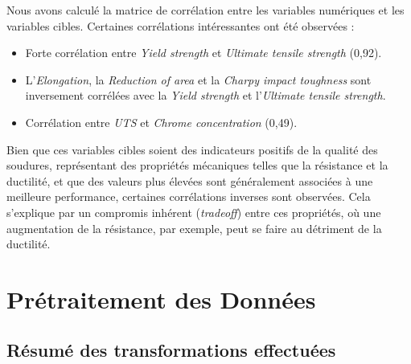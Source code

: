 \documentclass{article}
\begin{document}
Nous avons calculé la matrice de corrélation entre les variables numériques et les variables cibles. Certaines corrélations intéressantes ont été observées :

\begin{itemize}
    \item Forte corrélation entre \textit{Yield strength} et \textit{Ultimate tensile strength} (0,92).
    \item L'\textit{Elongation}, la \textit{Reduction of area} et la \textit{Charpy impact toughness} sont inversement corrélées avec la \textit{Yield strength} et l'\textit{Ultimate tensile strength}.
    \item Corrélation entre \textit{UTS} et \textit{Chrome concentration} (0,49).
\end{itemize}

\vspace{0.25cm}

Bien que ces variables cibles soient des indicateurs positifs de la qualité des soudures, représentant des propriétés mécaniques telles que la résistance et la ductilité, et que des valeurs plus élevées sont généralement associées à une meilleure performance, certaines corrélations inverses sont observées. Cela s'explique par un compromis inhérent (\textit{tradeoff}) entre ces propriétés, où une augmentation de la résistance, par exemple, peut se faire au détriment de la ductilité.

\section{Prétraitement des Données}

\subsection{Résumé des transformations effectuées}
\end{document}
